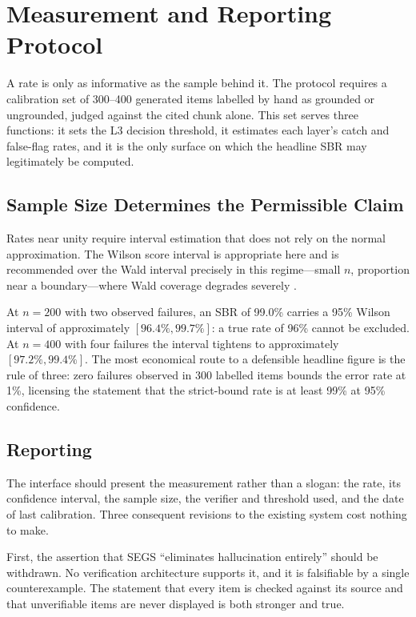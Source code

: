 \documentclass[stu,11pt,floatsintext]{apa7}
\begin{document}
\section{Measurement and Reporting Protocol}

A rate is only as informative as the sample behind it. The protocol requires a
calibration set of 300--400 generated items labelled by hand as grounded or
ungrounded, judged against the cited chunk alone. This set serves three
functions: it sets the L3 decision threshold, it estimates each layer's catch
and false-flag rates, and it is the only surface on which the headline SBR may
legitimately be computed.

\subsection{Sample Size Determines the Permissible Claim}

Rates near unity require interval estimation that does not rely on the normal
approximation. The Wilson score interval \parencite{wilson1927probable} is
appropriate here and is recommended over the Wald interval precisely in this
regime---small $n$, proportion near a boundary---where Wald coverage degrades
severely \parencite{brown2001interval}.

At $n = 200$ with two observed failures, an SBR of 99.0\% carries a 95\% Wilson
interval of approximately $[96.4\%, 99.7\%]$: a true rate of 96\% cannot be
excluded. At $n = 400$ with four failures the interval tightens to approximately
$[97.2\%, 99.4\%]$. The most economical route to a defensible headline figure is
the rule of three: zero failures observed in 300 labelled items bounds the error
rate at 1\%, licensing the statement that the strict-bound rate is at least 99\%
at 95\% confidence.

\subsection{Reporting}

The interface should present the measurement rather than a slogan: the rate, its
confidence interval, the sample size, the verifier and threshold used, and the
date of last calibration. Three consequent revisions to the existing system cost
nothing to make.

First, the assertion that SEGS ``eliminates hallucination entirely'' should be
withdrawn. No verification architecture supports it, and it is falsifiable by a
single counterexample. The statement that every item is checked against its
source and that unverifiable items are never displayed is both stronger and
true.
\end{document}
